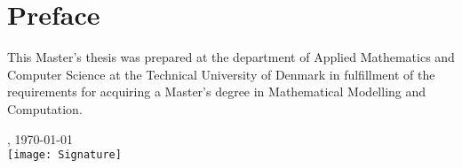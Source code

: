 \chapter{Preface}
This Master's thesis was prepared at the department of Applied Mathematics and Computer Science at the Technical University of Denmark in fulfillment of the requirements for acquiring a Master's degree in Mathematical Modelling and Computation.

\vfill

{
    \centering
    \thesislocation{}, \today\\[1cm]
    \hspace{3cm}\texttt{[image: Signature]}\\[1cm]
    \begin{flushright}
        \thesisauthor{}
    \end{flushright}
}